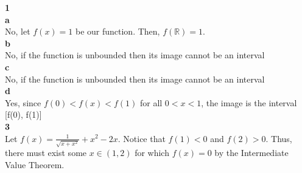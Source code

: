 \documentclass[addpoints]{exam}
\begin{document}
\begin{questions}
\question \textbf{1} \\
\textbf{a} \\
No, let $f(x) = 1$ be our function. Then, $f(\mathbb{R}) = 1$.\\ 
\textbf{b} \\
No, if the function is unbounded then its image cannot be an interval\\
\textbf{c} \\
No, if the function is unbounded then its image cannot be an interval\\
\textbf{d} \\
Yes, since $f(0) < f(x) < f(1)$ for all $0 < x < 1$, the image is the interval [f(0), f(1)]\\

\question \textbf{3} \\

Let $f(x) = \frac{1}{\sqrt{x + x^2}} + x^2 - 2x$. Notice that $f(1) < 0$ and $f(2) > 0$. Thus, there must exist some $x \in (1, 2)$ for
which $f(x) = 0$ by the Intermediate Value Theorem. 
\end{questions}
\end{document}
